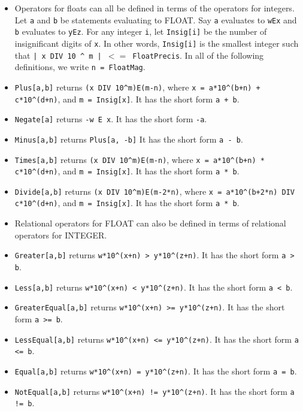 \begin{itemize}
\item
Operators for floats can all be defined in terms of the operators for
integers.  Let \verb+a+ and \verb+b+ be statements
evaluating to FLOAT. Say \verb+a+ evaluates to \verb+wEx+ and
\verb+b+ evaluates to \verb+yEz+.  For any integer \verb+i+, let 
\verb+Insig[i]+ be the number of insignificant digits of \verb+x+.  In
other words, \verb+Insig[i]+ is the smallest integer such that 
\verb+| x DIV 10 ^ m | +$<=$\verb+ FloatPrecis+.  In all of the following
definitions, we write \verb+n = FloatMag+.

\bd
\item
\verb+Plus[a,b]+ returns \verb&(x DIV 10^m)E(m-n)&, where 
\verb&x = a*10^(b+n) + c*10^(d+n)&, 
and \verb+m = Insig[x]+.  
It has the short form \verb&a + b&.
 
\item
\verb+Negate[a]+ returns \verb+-w E x+.  It has the short form \verb&-a&.  
 
\item
\verb+Minus[a,b]+ returns \verb+Plus[a, -b]+
It has the short form \verb&a - b&.  

\item
\verb+Times[a,b]+ returns \verb&(x DIV 10^m)E(m-n)&, where 
\verb&x = a*10^(b+n) * c*10^(d+n)&, 
and \verb+m = Insig[x]+.  
It has the short form \verb&a * b&.
 
\item
\verb+Divide[a,b]+ returns \verb&(x DIV 10^m)E(m-2*n)&, where 
\verb&x = a*10^(b+2*n) DIV c*10^(d+n)&, 
and \verb+m = Insig[x]+.  
It has the short form \verb&a * b&.
 
\ed
\item
Relational operators for FLOAT can also be defined in terms of
relational operators for INTEGER.  
\bd
\item
\verb+Greater[a,b]+ returns \verb&w*10^(x+n) > y*10^(z+n)&.
It has the short form \verb+a > b+.

\item 
\verb+Less[a,b]+ returns \verb&w*10^(x+n) < y*10^(z+n)&.
It has the short form \verb+a < b+.

\item
\verb+GreaterEqual[a,b]+ returns \verb&w*10^(x+n) >= y*10^(z+n)&.
It has the short form \verb+a >= b+.

\item 
\verb+LessEqual[a,b]+ returns \verb&w*10^(x+n) <= y*10^(z+n)&.
It has the short form \verb+a <= b+.

\item 
\verb+Equal[a,b]+ returns \verb&w*10^(x+n) = y*10^(z+n)&.
It has the short form \verb+a = b+.

\item 
\verb+NotEqual[a,b]+ returns \verb&w*10^(x+n) != y*10^(z+n)&.
It has the short form \verb+a != b+.

\ed
\end{itemize}

